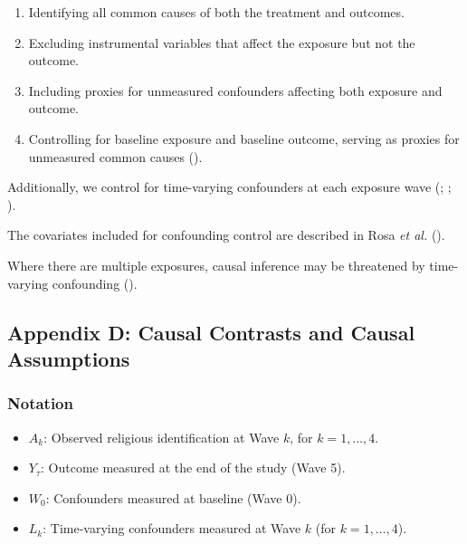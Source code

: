 \documentclass[
  single column]{article}
\providecommand{\tightlist}{%
  \setlength{\itemsep}{0pt}\setlength{\parskip}{0pt}}
\begin{document}
\begin{enumerate}
\def\labelenumi{\arabic{enumi}.}
\tightlist
\item
  Identifying all common causes of both the treatment and outcomes.
\item
  Excluding instrumental variables that affect the exposure but not the
  outcome.
\item
  Including proxies for unmeasured confounders affecting both exposure
  and outcome.
\item
  Controlling for baseline exposure and baseline outcome, serving as
  proxies for unmeasured common causes
  ().
\end{enumerate}

Additionally, we control for time-varying confounders at each exposure
wave (;
;
).

The covariates included for confounding control are described in Rosa
\emph{et al.} ().

Where there are multiple exposures, causal inference may be threatened
by time-varying confounding
().

\newpage{}

\subsection{Appendix D: Causal Contrasts and Causal
Assumptions}\label{appendix-assumptions}

\subsubsection{Notation}\label{notation}

\begin{itemize}
\tightlist
\item
  \(A_k\): Observed religious identification at Wave \(k\), for
  \(k = 1, \dots, 4\).\\
\item
  \(Y_\tau\): Outcome measured at the end of the study (Wave 5).\\
\item
  \(W_0\): Confounders measured at baseline (Wave 0).\\
\item
  \(L_k\): Time-varying confounders measured at Wave \(k\) (for
  \(k = 1, \dots, 4\)).
\end{itemize}
\end{document}
